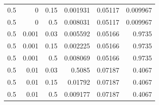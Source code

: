 \begin{table}[t]
{\begin{tabular}{lrrrrr}
0.5  &  0  &  0.15  &  0.001931  &  0.05117  &  0.009967\\
0.5  &  0  &  0.5  &  0.008031  &  0.05117  &  0.009967\\
0.5  &  0.001  &  0.03  &  0.005592  &  0.05166  &  0.9735\\
0.5  &  0.001  &  0.15  &  0.002225  &  0.05166  &  0.9735\\
0.5  &  0.001  &  0.5  &  0.008069  &  0.05166  &  0.9735\\
0.5  &  0.01  &  0.03  &  0.5085  &  0.07187  &  0.4067\\
0.5  &  0.01  &  0.15  &  0.01792  &  0.07187  &  0.4067\\
0.5  &  0.01  &  0.5  &  0.009177  &  0.07187  &  0.4067\\
\bottomrule\end{tabular}}
\end{table}
